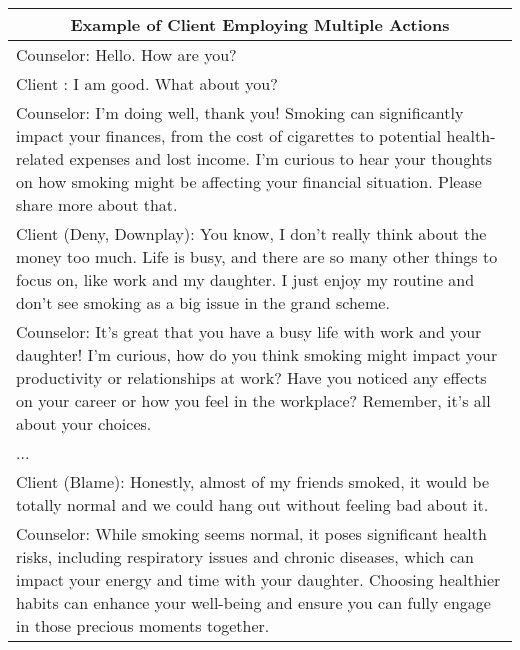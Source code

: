 \begin{table*}[htbp]
\centering
\begin{tabularx}{\textwidth}{X}
\toprule
\multicolumn{1}{c}{\textbf{Example of Client Employing Multiple Actions}} \\ \midrule                                                                                             
Counselor: Hello. How are you?                                                                                                                                                                                                                                                                                                \\
Client   : I am good. What about you?                                                                                                                                                                                                                                                                                         \\
Counselor: I'm doing well, thank you! Smoking can significantly impact your finances, from the cost of cigarettes to potential health-related expenses and lost income. I'm curious to hear your thoughts on how smoking might be affecting your financial situation. Please share more about that.                           \\
Client ({\color{red}Deny}, {\color{green}Downplay}): {\color{red} You know, I don't really think about the money too much.} {\color{green} Life is busy, and there are so many other things to focus on, like work and my daughter. I just enjoy my routine and don't see smoking as a big issue in the grand scheme.}                                                                                \\
Counselor: It's great that you have a busy life with work and your daughter! I'm curious, how do you think smoking might impact your productivity or relationships at work? Have you noticed any effects on your career or how you feel in the workplace? Remember, it's all about your choices.                              \\
... \\
Client (Blame): Honestly, almost of my friends smoked, it would be totally normal and we could hang out without feeling bad about it.                   \\
Counselor: While smoking seems normal, it poses significant health risks, including respiratory issues and chronic diseases, which can impact your energy and time with your daughter. Choosing healthier habits can enhance your well-being and ensure you can fully engage in those precious moments together.              \\

\end{tabularx}
\end{table*}
